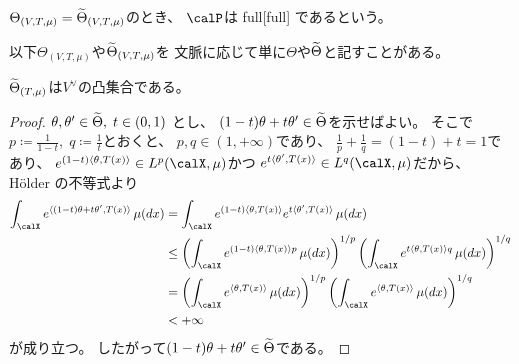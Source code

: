 \documentclass[report]{jlreq}
\begin{document}
\begin{definition}[full]
    $\Theta_{(V, T, \mu)} = \widetilde{\Theta}_{(V, T, \mu)}$のとき、
    $\calP$は
        {full}[full]
    であるという。
\end{definition}

以下$\Theta_{(V, T, \mu)}$や$\widetilde{\Theta}_{(V, T, \mu)}$を
文脈に応じて単に$\Theta$や$\widetilde{\Theta}$と記すことがある。

\begin{proposition}
    $\widetilde{\Theta}_{(T, \mu)}$は$V^\vee$の凸集合である。
\end{proposition}

\begin{proof}
    $\theta, \theta' \in \widetilde{\Theta}, \;
        t \in (0, 1)$
    とし、
    $(1 - t) \theta + t \theta' \in \widetilde{\Theta}$を示せばよい。
    そこで$p \coloneqq \frac{1}{1 - t}, \; q \coloneqq \frac{1}{t}$とおくと、
    $p, q \in (1, +\infty)$であり、
    $\frac{1}{p} + \frac{1}{q} = (1 - t) + t = 1$であり、
    $e^{(1 - t)\langle \theta, T(x) \rangle} \in L^p(\calX, \mu)$かつ
    $e^{t \langle \theta', T(x) \rangle} \in L^q(\calX, \mu)$だから、
    H\"older の不等式より
    \begin{alignat}{1}
        \int_\calX e^{\langle (1 - t) \theta + t \theta', T(x) \rangle} \, \mu(dx)
            &= \int_\calX
                e^{(1 - t) \langle \theta, T(x) \rangle}
                e^{t \langle \theta', T(x) \rangle}
                \, \mu(dx) \\
            &\le \myparen{
                \int_\calX
                e^{(1 - t) \langle \theta, T(x) \rangle p}
                \, \mu(dx)
            }^{1 / p}
            \myparen{
                \int_\calX
                e^{t \langle \theta, T(x) \rangle q}
                \, \mu(dx)
            }^{1 / q} \\
            &= \myparen{
                \int_\calX
                e^{\langle \theta, T(x) \rangle}
                \, \mu(dx)
            }^{1 / p}
            \myparen{
                \int_\calX
                e^{\langle \theta, T(x) \rangle}
                \, \mu(dx)
            }^{1 / q} \\
            &< +\infty
    \end{alignat}
    が成り立つ。
    したがって$(1 - t) \theta + t \theta' \in \widetilde{\Theta}$である。
\end{proof}
\end{document}

